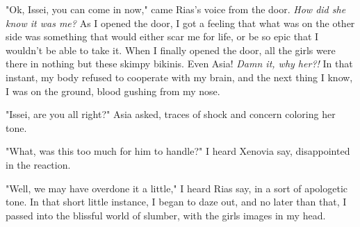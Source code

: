 \documentclass{article}
\begin{document}
"Ok, Issei, you can come in now," came Rias's voice from the door. \emph{How did she know it was me?} As I opened the door, I got a feeling that what was on the other side was something that would either scar me for life, or be so epic that I wouldn't be able to take it. When I finally opened the door, all the girls were there in nothing but these skimpy bikinis. Even Asia! \emph{Damn it, why her?!} In that instant, my body refused to cooperate with my brain, and the next thing I know, I was on the ground, blood gushing from my nose.

"Issei, are you all right?" Asia asked, traces of shock and concern coloring her tone.

"What, was this too much for him to handle?" I heard Xenovia say, disappointed in the reaction.

"Well, we may have overdone it a little," I heard Rias say, in a sort of apologetic tone. In that short little instance, I began to daze out, and no later than that, I passed into the blissful world of slumber, with the girls images in my head.
\end{document}
